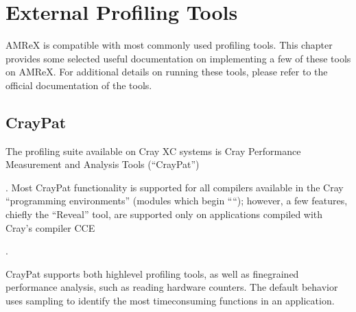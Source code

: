 \documentclass[letterpaper,10pt,english]{sphinxmanual}
\begin{document}
\chapter{External Profiling Tools}
\label{\detokenize{External_Profiling_Tools_Chapter:external-profiling-tools}}\label{\detokenize{External_Profiling_Tools_Chapter:chap-external-profiling-tools}}\label{\detokenize{External_Profiling_Tools_Chapter::doc}}
\sphinxAtStartPar
AMReX is compatible with most commonly used profiling tools. This chapter provides some
selected useful documentation on implementing a few of these tools on AMReX. For additional
details on running these tools, please refer to the official documentation of the tools.


\section{CrayPat}
\label{\detokenize{External_Profiling_Tools:craypat}}\label{\detokenize{External_Profiling_Tools::doc}}
\sphinxAtStartPar
The profiling suite available on Cray XC systems is Cray Performance
Measurement and Analysis Tools (“CrayPat”) \sphinxstepexplicit %
\begin{footnote}[1]\label{\thesphinxscope.1}%
\sphinxAtStartFootnote
{}
%
\end{footnote}.  Most CrayPat functionality is
supported for all compilers available in the Cray “programming environments”
(modules which begin ““); however, a few features, chiefly the
“Reveal” tool, are supported only on applications compiled with Cray’s compiler
CCE \sphinxstepexplicit %
\begin{footnote}[2]\label{\thesphinxscope.2}%
\sphinxAtStartFootnote
{}
%
\end{footnote} \sphinxstepexplicit %
\begin{footnote}[3]\label{\thesphinxscope.3}%
\sphinxAtStartFootnote
{}
%
\end{footnote}.

\sphinxAtStartPar
CrayPat supports both high\sphinxhyphen{}level profiling tools, as well as fine\sphinxhyphen{}grained
performance analysis, such as reading hardware counters. The default behavior
uses sampling to identify the most time\sphinxhyphen{}consuming functions in an application.
\end{document}
